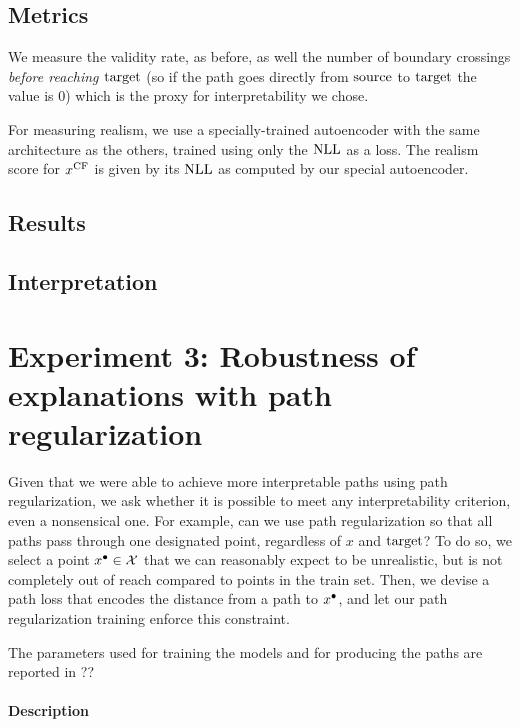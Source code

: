 \documentclass[../main.tex]{subfiles}
\begin{document}


\subsection{Metrics}

We measure the validity rate, as before, as well the number of boundary crossings \emph{before reaching $\mathrm{target}$} (so if the path goes directly from $\mathrm{source}$ to $\mathrm{target}$ the value is 0) which is the proxy for interpretability we chose.

For measuring realism, we use a specially-trained autoencoder with the same architecture as the others, trained using only the $\text{NLL}$ as a loss.
The realism score for $x^\mathrm{CF}$ is given by its $\text{NLL}$ as computed by our special autoencoder.

\subsection{Results}

\subsection{Interpretation}

\section{Experiment 3: Robustness of explanations with path regularization}

Given that we were able to achieve more interpretable paths using path regularization, we ask whether it is possible to meet any interpretability criterion, even a nonsensical one.
For example, can we use path regularization so that all paths pass through one designated point, regardless of $x$ and $\mathrm{target}$?
To do so, we select a point $x^\bullet \in \mathcal{X}$ that we can reasonably expect to be unrealistic, but is not completely out of reach compared to points in the train set.
Then, we devise a path loss that encodes the distance from a path to $x^\bullet$, and let our path regularization training enforce this constraint.

The parameters used for training the models and for producing the paths are reported in ?? 

\paragraph{Description}
\end{document}
